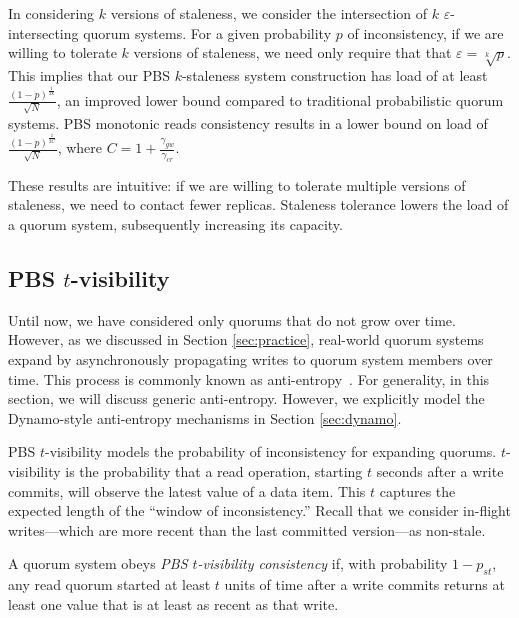 \documentclass{vldb}
\newcommand{\subsectionskip}{-0em}
\begin{document}
In considering $k$ versions of staleness, we consider the intersection
of $k$ $\varepsilon$-intersecting quorum systems.  For a given
probability $p$ of inconsistency, if we are willing to tolerate $k$
versions of staleness, we need only require that that $\varepsilon =
\sqrt[k]{p}$.  This implies that our PBS $k$-staleness system
construction has load of at least
$\frac{(1-p)^{\frac{1}{2k}}}{\sqrt{N}}$, an improved lower bound
compared to traditional probabilistic quorum systems.  PBS monotonic
reads consistency results in a lower bound on load of
$\frac{(1-p)^{\frac{1}{2C}}}{\sqrt{N}}$, where
$C=1+\frac{\gamma_{gw}}{\gamma_{cr}}$.

These results are intuitive: if we are willing to tolerate multiple
versions of staleness, we need to contact fewer replicas.  Staleness
tolerance lowers the load of a quorum system, subsequently increasing
its capacity.

\vspace{\subsectionskip}\subsection{PBS $t$-visibility}
\label{sec:tvis}

Until now, we have considered only quorums that do not grow over time.
However, as we discussed in Section \ref{sec:practice}, real-world
quorum systems expand by asynchronously propagating writes to quorum
system members over time.  This process is commonly known as
anti-entropy~\cite{antientropy}.  For generality, in this section, we
will discuss generic anti-entropy. However, we explicitly model the
Dynamo-style anti-entropy mechanisms in Section \ref{sec:dynamo}.

PBS $t$-visibility models the probability of inconsistency for
expanding quorums.  $t$-visibility is the probability that a read
operation, starting $t$ seconds after a write commits, will observe
the latest value of a data item. This $t$ captures the expected length
of the ``window of inconsistency.''  Recall that we consider in-flight
writes---which are more recent than the last committed version---as
non-stale.

\begin{definition}
A quorum system obeys \textit{PBS $t$-visibility consistency} if, with
probability $1-p_{st}$, any read quorum started at least $t$ units
of time after a write commits returns at least one value
that is at least as recent as that write.
\end{definition}
\end{document}
